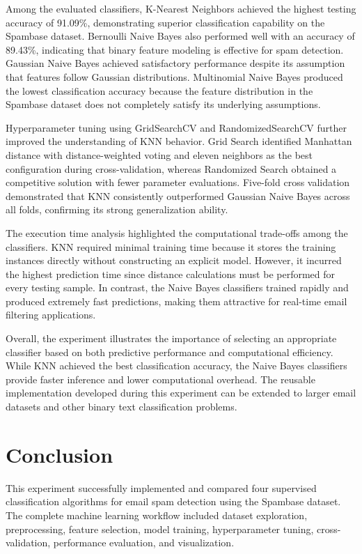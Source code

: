 \documentclass[12pt,a4paper]{article}
\begin{document}
	Among the evaluated classifiers, K-Nearest Neighbors achieved the highest testing accuracy of 91.09\%, demonstrating superior classification capability on the Spambase dataset. Bernoulli Naive Bayes also performed well with an accuracy of 89.43\%, indicating that binary feature modeling is effective for spam detection. Gaussian Naive Bayes achieved satisfactory performance despite its assumption that features follow Gaussian distributions. Multinomial Naive Bayes produced the lowest classification accuracy because the feature distribution in the Spambase dataset does not completely satisfy its underlying assumptions.
	
	Hyperparameter tuning using GridSearchCV and RandomizedSearchCV further improved the understanding of KNN behavior. Grid Search identified Manhattan distance with distance-weighted voting and eleven neighbors as the best configuration during cross-validation, whereas Randomized Search obtained a competitive solution with fewer parameter evaluations. Five-fold cross validation demonstrated that KNN consistently outperformed Gaussian Naive Bayes across all folds, confirming its strong generalization ability.
	
	The execution time analysis highlighted the computational trade-offs among the classifiers. KNN required minimal training time because it stores the training instances directly without constructing an explicit model. However, it incurred the highest prediction time since distance calculations must be performed for every testing sample. In contrast, the Naive Bayes classifiers trained rapidly and produced extremely fast predictions, making them attractive for real-time email filtering applications.
	
	Overall, the experiment illustrates the importance of selecting an appropriate classifier based on both predictive performance and computational efficiency. While KNN achieved the best classification accuracy, the Naive Bayes classifiers provide faster inference and lower computational overhead. The reusable implementation developed during this experiment can be extended to larger email datasets and other binary text classification problems.
	
	\section{Conclusion}
	
	This experiment successfully implemented and compared four supervised classification algorithms for email spam detection using the Spambase dataset. The complete machine learning workflow included dataset exploration, preprocessing, feature selection, model training, hyperparameter tuning, cross-validation, performance evaluation, and visualization.
	
\end{document}
